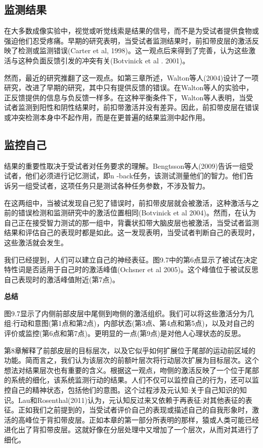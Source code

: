 \subsection{监测结果}
\par
在大多数成像实验中，视觉或听觉线索是结果的信号，而不是为受试者提供食物或强迫他们忍受疼痛。早期的研究表明，当受试者监测结果时，前扣带皮层的激活反映了检测或监测错误(Carter et al, 1998)。这一观点后来得到了完善，认为这些激活与这种负面反馈引发的冲突有关(Botvinick et al . 2001)。
\par
然而，最近的研究推翻了这一观点。如第三章所述，Walton等人(2004)设计了一项研究，改进了早期的研究，其中只有提供反馈的错误。在Walton等人的实验中，正反馈提供的信息与负反馈一样多。在这种平衡条件下，Walton等人表明，当受试者监测到阳性和阴性结果时，前扣带激活并没有差异。因此，前扣带皮层在错误或冲突检测本身中不起作用，而是在更普遍的结果监测中起作用。
\par
\subsection{监控自己}
\par
结果的重要性取决于受试者对任务要求的理解。Bengtsson等人(2009)告诉一组受试者，他们必须进行记忆测试，即n -back任务，该测试测量他们的智力。他们告诉另一组受试者，这项任务只是测试各种任务参数，不涉及智力。
\par
在这两组中，当被试发现自己犯了错误时，前扣带皮层就会被激活，这种激活与之前的错误检测和监测研究中的激活位置相同(Botvinick et al 2004)。然而，在认为自己正在接受智力测试的那一组中，背囊状扣带大脑皮层也被激活，当受试者监测结果和评估自己的表现时都是如此。这一发现表明，当受试者判断自己的表现时，这些激活就会发生。
\par
我们已经提到，人们可以建立自己的神经表征。图9.7中的第6点显示了被试在决定特性词是否适用于自己时的激活峰值(Ochsner et al 2005)。这个峰值位于被试反思自己表现时的激活峰值附近(第7点)。
\par
\textbf{总结}
\par
图9.7显示了内侧前部皮层中尾侧到吻侧的激活组织。我们可以将这些激活分为几组:行动和意图(第1点和第2点)，内部状态(第3点、第4点和第5点)，以及对自己的评价或监控(第6点和第7点)。更明显的一点(第9点)是对他人心理状态的反思。
\par
第8章解释了前部皮层的目标层次，以及它似乎如何扩展位于尾部的运动前区域的功能。简而言之，我们认为该层次的前额叶层次将行动层次扩展为目标层次。这个想法对结果层次也有重要的含义。根据这一观点，吻侧的激活反映了一个位于尾部的系统的细化，该系统监测行动的结果。人们不仅可以监控自己的行为，还可以监控自己的精神状态，包括他们的意图。这个过程涉及元认知:关于自己知识的知识。Lau和Rosenthal(2011)认为，元认知反过来又依赖于再表征:对其他表征的表征。正如我们之前提到的，当受试者评价自己的表现或描述自己的自我形象时，激活的高峰位于背扣带皮层。正如本章的第一部分所表明的那样，猿或人类可能已经进化出了背扣带皮层。这就好像在分层处理中又增加了一个层次，从而对其进行了细化。
